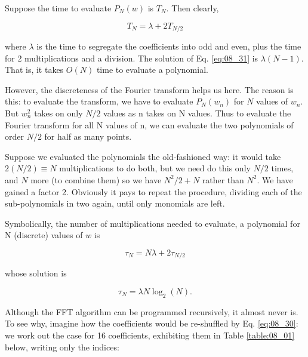 Suppose the time to evaluate $P_N(w)$ is $T_{N}$. Then clearly,

\begin{equation}\label{eq:08_31}
T_{N} = \lambda + 2T_{N/2}
\end{equation}

where $\lambda$ is the time to segregate the coefficients into odd and even, plus the time for 2 multiplications and a division. The solution of Eq. \ref{eq:08_31} is $\lambda(N-1)$. That is, it takes $O(N)$ time to evaluate a polynomial.

However, the discreteness of the Fourier transform helps us here. The reason is this: to evaluate the transform, we have to evaluate $P_{N}(w_{n})$ for $N$ values of $w_{n}$. But $w_{n}^{2}$ takes on only $N/2$ values as n takes on N values. Thus to evaluate the Fourier transform for all N values of n, we can evaluate the two polynomials of order $N/2$ for half as many points.

Suppose we evaluated the polynomials the old-fashioned way: it would take $2(N/2)\equiv N$ multiplications to do both, but we need do this only $N/2$ times, and $N$ more (to combine them) so we have $N^{2}/2+N$ rather than $N^{2}$. We have gained a factor 2. Obviously it pays to repeat the procedure, dividing each of the sub-polynomials in two again, until only monomials are left.

Symbolically, the number of multiplications needed to evaluate, a polynomial for N (discrete) values of $w$ is

\begin{equation}
\tau_{N} = N\lambda + 2\tau_{N/2}
\end{equation}

whose solution is

\begin{equation}
\tau_{N} = \lambda N \log_{2}(N).
\end{equation}

Although the FFT algorithm can be programmed recursively, it almost never is. To see why, imagine how the coefficients would be re-shuffled by Eq. \ref{eq:08_30}: we work out the case for 16 coefficients, exhibiting them in Table \ref{table:08_01} below, writing only the indices:

